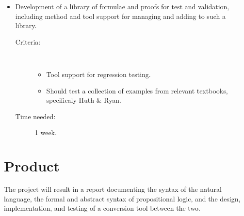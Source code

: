 \documentclass[a4paper]{article}
\begin{document}
\begin{itemize}
\item
    Development of a library of formulae and proofs for test and validation,
    including method and tool support for managing and adding to such a 
    library.
    \begin{description}
        \item[Criteria:]~ \\ \vspace{-5 mm}
            \begin{itemize}
                \item Tool support for regression testing.
                \item Should test a collection of examples from relevant
                textbooks, specificaly Huth \& Ryan\cite{hr}.
            \end{itemize}
        \item[Time needed:] 1 week.
    \end{description}
\end{itemize}

\section{Product}
The project will result in a report documenting the syntax of the 
natural language, the formal and abstract syntax of propositional 
logic, and the design, implementation, and testing of a conversion tool 
between the two.

\label{LastBody}


\end{document}
